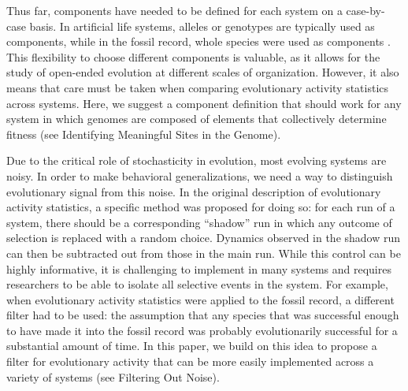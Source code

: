 \documentclass[letterpaper]{article}
\begin{document}
Thus far, components have needed to be defined for each system on a case-by-case basis.  In artificial life systems, alleles or genotypes are typically used as components, while in the fossil record, whole species were used as components \citep{bedau1998classification}.
This flexibility to choose different components is valuable, as it allows for the study of open-ended evolution at different scales of organization. However, it also means that care must be taken when comparing evolutionary activity statistics across systems. Here, we suggest a component definition that should work for any system in which genomes are composed of elements that collectively determine fitness (see Identifying Meaningful Sites in the Genome).

Due to the critical role of stochasticity in evolution, most evolving systems are noisy. In order to make behavioral generalizations, we need a way to distinguish evolutionary signal from this noise. In the original description of evolutionary activity statistics, a specific method was proposed for doing so: for each run of a system, there should be a corresponding ``shadow'' run in which any outcome of selection is replaced with a random choice. Dynamics observed in the shadow run can then be subtracted out from those in the main run. While this control can be highly informative, it is challenging to implement in many systems and requires researchers to be able to isolate all selective events in the system. For example, when evolutionary activity statistics were applied to the fossil record, a different filter had to be used: the assumption that any species that was successful enough to have made it into the fossil record was probably evolutionarily successful for a substantial amount of time. In this paper, we build on this idea to propose a filter for evolutionary activity that can be more easily implemented across a variety of systems (see Filtering Out Noise).
\end{document}
